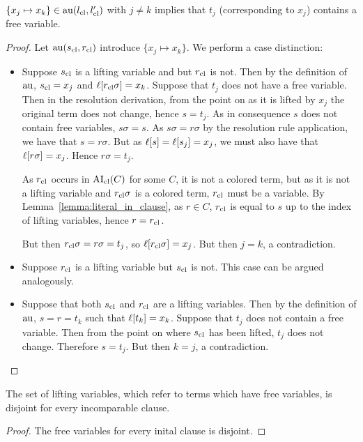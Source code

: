 \documentclass[,%
	paper=a4,%
	twoside=false,%
	liststotoc,
	bibtotoc,
	draft=false,%
	numbers=noendperiod
]{scrartcl}
\begin{document}
\begin{lemma}
	\label{lemma:tau_only_for_variable_terms}
	$\{x_j \mapsto x_k\} \in \operatorname{au}(l_\mathrm{cl}, l_\mathrm{cl}')$ with $j\neq k$ implies that $t_j$ (corresponding to $x_j$) contains a free variable.
\end{lemma}
\begin{proof}
	Let  $\operatorname{au}(s_\mathrm{cl}, r_\mathrm{cl})$ introduce $\{x_j \mapsto x_k\}$.
	We perform a case distinction:
	\begin{itemize}
			\item Suppose $s_\mathrm{cl}$ is a lifting variable and but $r_\mathrm{cl}$ is not.
	Then by the definition of $\operatorname{au}$, $s_\mathrm{cl} = x_j$ and $\ell[r_\mathrm{cl}\sigma] = x_k$.
	Suppose that $t_j$ does not have a free variable.
	Then in the resolution derivation, from the point on as it is lifted by $x_j$ the original term does not change, hence $s = t_j$. As in consequence $s$ does not contain free variables, $s\sigma = s$.
	As $s\sigma = r\sigma$ by the resolution rule application, we have that $s = r\sigma$.
	But as $\ell[s] = \ell[s_j] = x_j$, we must also have that $\ell[r\sigma] = x_j$.
	Hence $r\sigma = t_j$.

	As $r_\mathrm{cl}$ occurs in $\operatorname{AI}_\mathrm{cl}(C)$ for some $C$, it is not a colored term, but as it is not a lifting variable and $r_\mathrm{cl}\sigma$ is a colored term, $r_\mathrm{cl}$ must be a variable.
	By Lemma~\ref{lemma:literal_in_clause}, as $r \in C$, $r_\mathrm{cl}$ is equal to $s$ up to the index of lifting variables, hence $r = r_\mathrm{cl}$.
	
	But then $r_\mathrm{cl}\sigma = r\sigma = t_j$, so $\ell[r_\mathrm{cl}\sigma] = x_j$. But then $j=k$, a contradiction.

			\item Suppose $r_\mathrm{cl}$ is a lifting variable but $s_\mathrm{cl}$ is not. This case can be argued analogously.

			\item Suppose that both $s_\mathrm{cl}$ and $r_\mathrm{cl}$ are a lifting variables.
				Then by the definition of $\operatorname{au}$, $s = r = t_k$ such that $\ell[t_k] = x_k$.
				Suppose that $t_j$ does not contain a free variable. Then from the point on where $s_\mathrm{cl}$ has been lifted, $t_j$ does not change. Therefore $s = t_j$. But then $k=j$, a contradiction.
				\qedhere
	\end{itemize}
\end{proof}

\begin{lemma}
	\label{lemma:disjoint_lifting_variables}
	The set of lifting variables, which refer to terms which have free variables, is disjoint for every incomparable clause.
\end{lemma}
\begin{proof}
	The free variables for every inital clause is disjoint.
\end{proof}
\end{document}
